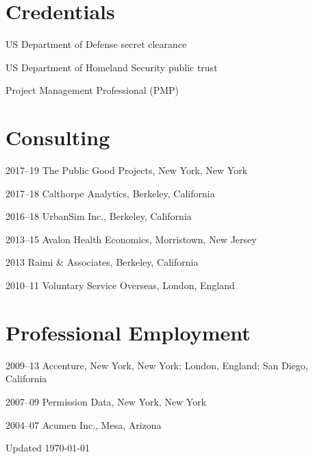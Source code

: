 \documentclass[11pt,letterpaper]{report} %
\newcommand{\listitemspace}{0.25em}
\renewenvironment{itemize}
{
  \begin{list}{}{\setlength{\leftmargin}{0em}
      \setlength{\parskip}{0em}
      \setlength{\itemsep}{\listitemspace}
  \setlength{\parsep}{\listitemspace}}}
  {
\end{list}}
\begin{document}
\section*{Credentials}

\begin{itemize}

  \item US Department of Defense secret clearance
  \item US Department of Homeland Security public trust
  \item Project Management Professional (PMP)

\end{itemize}

\section*{Consulting}

\begin{tablist}

\item[2017--19] \tab{}The Public Good Projects, New York, New York
\item[2017--18] \tab{}Calthorpe Analytics, Berkeley, California
\item[2016--18] \tab{}UrbanSim Inc., Berkeley, California
\item[2013--15] \tab{}Avalon Health Economics, Morristown, New Jersey
\item[2013]     \tab{}Raimi \& Associates, Berkeley, California
\item[2010--11] \tab{}Voluntary Service Overseas, London, England

\end{tablist}

\section*{Professional Employment}

\begin{tablist}

\item[2009--13] \tab{}Accenture, New York, New York; London, England; San Diego, California
\item[2007--09] \tab{}Permission Data, New York, New York
\item[2004--07] \tab{}Acumen Inc., Mesa, Arizona

\end{tablist}

\begin{center}
  \vfill
  Updated \monthyeardate\today
\end{center}
\end{document}
